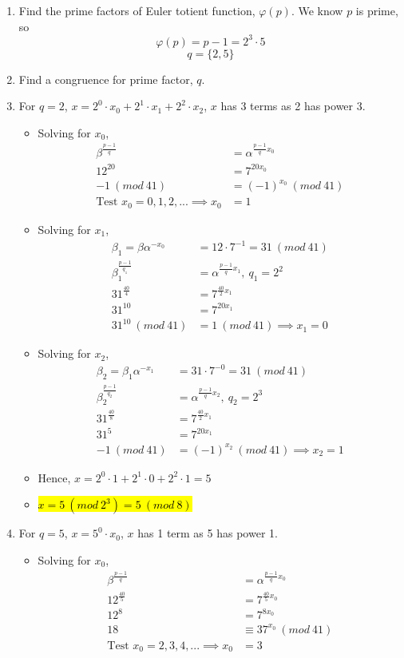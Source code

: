 \documentclass{article}
\begin{document}
\begin{enumerate}
	\item Find the prime factors of Euler totient function, $\varphi(p)$. We know $p$ is prime, so
	\[
	\varphi(p)=p-1=2^3\cdot5
	\]
	\[
	q=\{2,5\}
	\]
	\item Find a congruence for prime factor, $q$.
	\item For $q=2$, $x=2^0\cdot x_0+2^1\cdot x_1+2^2\cdot x_2$, $x$ has 3 terms as 2 has power 3.
	\begin{itemize}
		\item Solving for $x_0$,
		\begin{align}
		\beta^{\frac{p-1}{q}} &= \alpha^{\frac{p-1}{q}x_0} \\
		12^{20} & = 7^{20x_0} \\
		-1\ (mod\ 41) &= (-1)^{x_0}\ (mod\ 41) \\
		\text{Test } x_0=0,1,2,...\implies x_0&=1
		\end{align}
		
		\item Solving for $x_1$,
		\begin{align}
		\beta_1=\beta\alpha^{-x_0}&=12\cdot7^{-1}=31\ (mod\ 41)\\
		\beta_1^{\frac{p-1}{q_1}} &= \alpha^{\frac{p-1}{q}x_1},\ q_1=2^2\\
		31^{\frac{40}{4}}&=7^{\frac{40}{2}x_1}\\
		31^{10}&=7^{20x_1}\\
		31^{10}\ (mod\ 41)&=1\ (mod\ 41)\implies x_1=0
		\end{align}
		
		\item Solving for $x_2$,
		\begin{align}
		\beta_2=\beta_1\alpha^{-x_1}&=31\cdot 7^{-0}=31\ (mod\ 41)\\
		\beta_2^{\frac{p-1}{q_2}} &= \alpha^{\frac{p-1}{q}x_2},\ q_2=2^3\\
		31^{\frac{40}{8}}&=7^{\frac{40}{2}x_1}\\
		31^{5}&=7^{20x_1}\\
		-1\ (mod\ 41)&=(-1)^{x_2}\ (mod\ 41)\implies x_2=1
		\end{align}
		
		\item Hence, $x = 2^0\cdot1 + 2^1\cdot 0 + 2^2\cdot1 = 5$
		\item \hl{$x=5\ (mod\ 2^3)=5\ (mod\ 8)$}
	\end{itemize}
	\newpage
	
	\item For $q=5$, $x=5^0\cdot x_0$, $x$ has 1 term as 5 has power 1.
	\begin{itemize}
		\item Solving for $x_0$,
		\begin{align}
		\beta^{\frac{p-1}{q}} &= \alpha^{\frac{p-1}{q}x_0} \\
		12^{\frac{40}{5}} & = 7^{\frac{40}{5}x_0} \\
		12^8 &= 7^{8x_0}\\
		18 &\equiv 37^{x_0}\ (mod\ 41) \\
		\text{Test } x_0=2,3,4,...\implies x_0&=3
		\end{align}
		

\end{itemize}
\end{enumerate}
\end{document}
